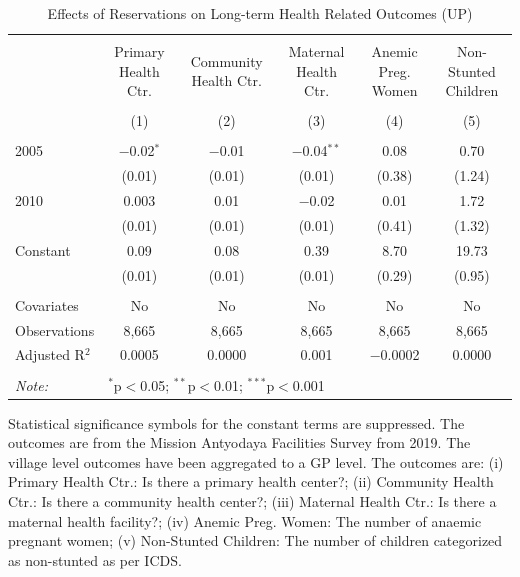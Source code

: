 \begin{table}
\centering
\begin{threeparttable}

  \caption{Effects of Reservations on Long-term Health Related Outcomes (UP)} 
  \label{up_shrug_health_05_10} 
\scriptsize 
\begin{tabular}{@{\extracolsep{0pt}}lccccc} 
\\[-1.8ex]\hline 
\hline \\[-1.8ex] 
 & Primary Health Ctr. & Community Health Ctr. & Maternal Health Ctr. & Anemic Preg. Women & Non-Stunted Children \\ 
\\[-1.8ex] & (1) & (2) & (3) & (4) & (5)\\ 
\hline \\[-1.8ex] 
 2005 & $-$0.02$^{*}$ & $-$0.01 & $-$0.04$^{**}$ & 0.08 & 0.70 \\ 
  & (0.01) & (0.01) & (0.01) & (0.38) & (1.24) \\ 
  2010 & 0.003 & 0.01 & $-$0.02 & 0.01 & 1.72 \\ 
  & (0.01) & (0.01) & (0.01) & (0.41) & (1.32) \\ 
  Constant & 0.09 & 0.08 & 0.39 & 8.70 & 19.73 \\ 
  & (0.01) & (0.01) & (0.01) & (0.29) & (0.95) \\ 
 \hline \\[-1.8ex] 
Covariates & No & No & No & No & No \\ 
Observations & 8,665 & 8,665 & 8,665 & 8,665 & 8,665 \\ 
Adjusted R$^{2}$ & 0.0005 & 0.0000 & 0.001 & $-$0.0002 & 0.0000 \\ 
\hline 
\hline \\[-1.8ex] 
\textit{Note:}  & \multicolumn{5}{l}{$^{*}$p$<$0.05; $^{**}$p$<$0.01; $^{***}$p$<$0.001} \\ 
\end{tabular} 
\begin{tablenotes}[flushleft]
\setlength{\itemindent}{0em}
\scriptsize
\item[] Statistical significance symbols for the constant terms are suppressed. The outcomes are from the Mission Antyodaya Facilities Survey from 2019. The village level outcomes have been aggregated to a GP level. The outcomes are:
                    (i) Primary Health Ctr.: Is there a primary health center?;
                    (ii) Community Health Ctr.: Is there a community health center?;
                    (iii) Maternal Health Ctr.: Is there a maternal health facility?;
                    (iv) Anemic Preg. Women: The number of anaemic pregnant women;
                    (v) Non-Stunted Children: The number of children categorized as non-stunted as per ICDS.
\end{tablenotes}
\end{threeparttable}
\end{table}
